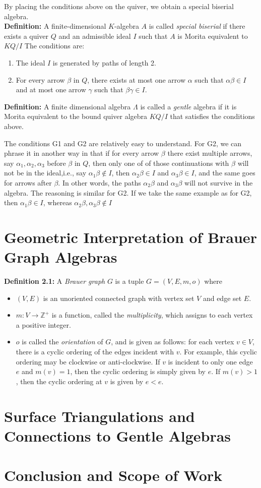 \documentclass{article}
\numberwithin{figure}{section}
\begin{document}
By placing the conditions above on the quiver, we obtain a special biserial algebra.\\

\textbf{Definition: } A finite-dimensional $K$-algebra $A$ is called \textit{special biserial} if there exists a quiver $Q$ and an admissible ideal $I$ such that $A$ is Morita equivalent to $KQ/I$ 
The conditions are:
\begin{enumerate}
    
    \item[G3)] The ideal $I$ is generated by paths of length 2.
    \item[G4)] For every arrow $\beta$ in $Q$, there exists at most one arrow $\alpha$ such that $\alpha\beta\in I$ and at most one arrow $\gamma$ such that $\beta\gamma \in I$.       
\end{enumerate}
 

 \textbf{Definition: } A finite dimensional algebra $\Lambda$ is called a \textit{gentle} algebra if it is Morita equivalent to the bound quiver algebra $KQ/I$ that satisfies the conditions above. 

 The conditions G1 and G2 are relatively easy to understand. For G2, we can phrase it in another way in that if for every arrow $\beta$ there exist multiple arrows, say $\alpha_1, \alpha_2,\alpha_3$ before $\beta$ in $Q$, then only one of of those continuations with $\beta$ will not be in the ideal,i.e., say $\alpha_1\beta\notin I$, then $\alpha_2\beta\in I$ and $\alpha_3\beta\in I$, and the same goes for arrows after $\beta$. In other words, the paths $\alpha_2\beta$ and $\alpha_3\beta$ will not survive in the algebra. The reasoning is similar for G2. If we take the same example as for G2, then $\alpha_1\beta \in I$, whereas $\alpha_2\beta, \alpha_3\beta\notin I$
 
\section{Geometric Interpretation of Brauer Graph Algebras}

\textbf{Definition 2.1: } A \textit{Brauer graph} $G$ is a tuple $G=(V,E,m,o)$ where 
\begin{itemize}
    \item $(V,E)$ is an unoriented connected graph with vertex set $V$ and edge set $E$.
    \item $m: V \to \mathbb{Z}^+$ is a function, called the \textit{multiplicity}, which assigns to each vertex a positive integer.
    \item $o$ is called the \textit{orientation} of $G$, and is given as follows: for each vertex $v \in V$, there is a cyclic ordering of the edges incident with $v$. For example, this cyclic ordering may be clockwise or anti-clockwise. If $v$ is incident to only one edge $e$ and $m(v)=1$, then the cyclic ordering is simply given by $e$. If $m(v) > 1$, then the cyclic ordering at $v$ is given by $e<e$.
\end{itemize}
\section{Surface Triangulations and Connections to Gentle Algebras}
\section{Conclusion and Scope of Work}
\end{document}
